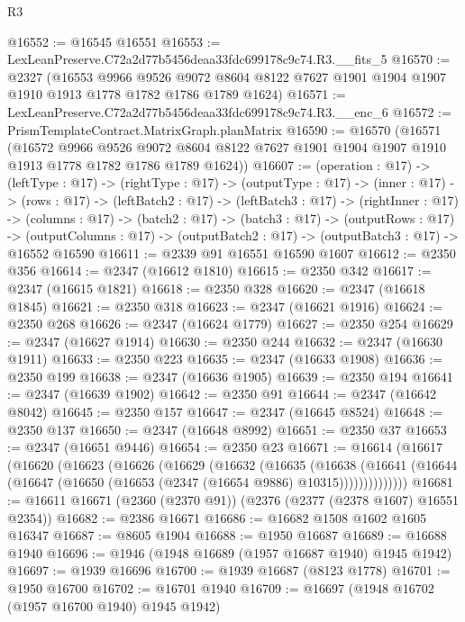 \begin{lexlean}{R3}
\begin{coremodule}
@16552 := @16545 @16551
@16553 := LexLeanPreserve.C72a2d77b5456deaa33fdc699178c9c74.R3.__fits_5
@16570 := @2327
    (@16553
      @9966
      @9526
      @9072
      @8604
      @8122
      @7627
      @1901
      @1904
      @1907
      @1910
      @1913
      @1778
      @1782
      @1786
      @1789
      @1624)
@16571 := LexLeanPreserve.C72a2d77b5456deaa33fdc699178c9c74.R3.__enc_6
@16572 := PrismTemplateContract.MatrixGraph.planMatrix
@16590 := @16570
    (@16571
      (@16572
        @9966
        @9526
        @9072
        @8604
        @8122
        @7627
        @1901
        @1904
        @1907
        @1910
        @1913
        @1778
        @1782
        @1786
        @1789
        @1624))
@16607 := (operation : @17) ->
  (leftType : @17) ->
  (rightType : @17) ->
  (outputType : @17) ->
  (inner : @17) ->
  (rows : @17) ->
  (leftBatch2 : @17) ->
  (leftBatch3 : @17) ->
  (rightInner : @17) ->
  (columns : @17) ->
  (batch2 : @17) ->
  (batch3 : @17) ->
  (outputRows : @17) ->
  (outputColumns : @17) -> (outputBatch2 : @17) -> (outputBatch3 : @17) -> @16552 @16590
@16611 := @2339 @91 @16551 @16590 @1607
@16612 := @2350 @356
@16614 := @2347 (@16612 @1810)
@16615 := @2350 @342
@16617 := @2347 (@16615 @1821)
@16618 := @2350 @328
@16620 := @2347 (@16618 @1845)
@16621 := @2350 @318
@16623 := @2347 (@16621 @1916)
@16624 := @2350 @268
@16626 := @2347 (@16624 @1779)
@16627 := @2350 @254
@16629 := @2347 (@16627 @1914)
@16630 := @2350 @244
@16632 := @2347 (@16630 @1911)
@16633 := @2350 @223
@16635 := @2347 (@16633 @1908)
@16636 := @2350 @199
@16638 := @2347 (@16636 @1905)
@16639 := @2350 @194
@16641 := @2347 (@16639 @1902)
@16642 := @2350 @91
@16644 := @2347 (@16642 @8042)
@16645 := @2350 @157
@16647 := @2347 (@16645 @8524)
@16648 := @2350 @137
@16650 := @2347 (@16648 @8992)
@16651 := @2350 @37
@16653 := @2347 (@16651 @9446)
@16654 := @2350 @23
@16671 := @16614
    (@16617
      (@16620
        (@16623
          (@16626
            (@16629
              (@16632
                (@16635
                  (@16638
                    (@16641
                      (@16644 (@16647 (@16650 (@16653 (@2347 (@16654 @9886) @10315))))))))))))))
@16681 := @16611 @16671 (@2360 (@2370 @91)) (@2376 (@2377 (@2378 @1607) @16551 @2354))
@16682 := @2386 @16671
@16686 := @16682 @1508 @1602 @1605 @16347
@16687 := @8605 @1904
@16688 := @1950 @16687
@16689 := @16688 @1940
@16696 := @1946 (@1948 @16689 (@1957 @16687 @1940) @1945 @1942)
@16697 := @1939 @16696
@16700 := @1939 @16687 (@8123 @1778)
@16701 := @1950 @16700
@16702 := @16701 @1940
@16709 := @16697 (@1948 @16702 (@1957 @16700 @1940) @1945 @1942)

\end{coremodule}
\end{lexlean}
